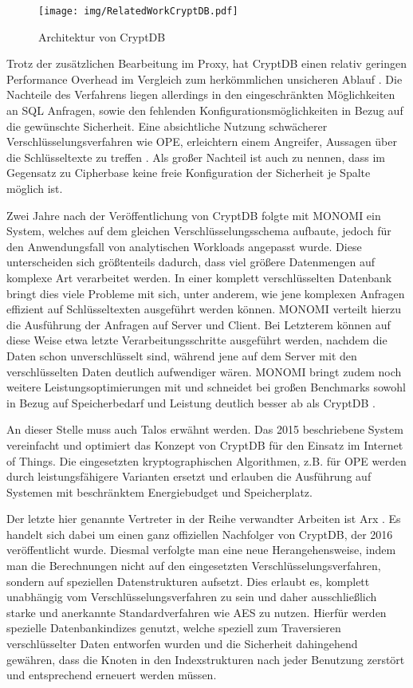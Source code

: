 \begin{figure}
	\texttt{[image: img/RelatedWorkCryptDB.pdf]}
	\centering
	\caption{Architektur von CryptDB}
	\label{fig:cryptdb}
\end{figure}

Trotz der zusätzlichen Bearbeitung im Proxy, hat CryptDB einen relativ geringen Performance Overhead im Vergleich zum herkömmlichen unsicheren Ablauf \cite{Popa2012}. Die Nachteile des Verfahrens liegen allerdings in den eingeschränkten Möglichkeiten an \ac{SQL} Anfragen, sowie den fehlenden Konfigurationsmöglichkeiten in Bezug auf die gewünschte Sicherheit. Eine absichtliche Nutzung schwächerer Verschlüsselungsverfahren wie OPE, erleichtern einem Angreifer, Aussagen über die Schlüsseltexte zu treffen \cite{Poddar2016}. Als großer Nachteil ist auch zu nennen, dass im Gegensatz zu Cipherbase keine freie Konfiguration der Sicherheit je Spalte möglich ist.

Zwei Jahre nach der Veröffentlichung von CryptDB folgte mit MONOMI \cite{Tu2013} ein System, welches auf dem gleichen Verschlüsselungsschema aufbaute, jedoch für den Anwendungsfall von analytischen Workloads angepasst wurde. Diese unterscheiden sich größtenteils dadurch, dass viel größere Datenmengen auf komplexe Art verarbeitet werden. In einer komplett verschlüsselten Datenbank bringt dies viele Probleme mit sich, unter anderem, wie jene komplexen Anfragen effizient auf Schlüsseltexten ausgeführt werden können. MONOMI verteilt hierzu die Ausführung der Anfragen auf Server und Client. Bei Letzterem können auf diese Weise etwa letzte Verarbeitungsschritte ausgeführt werden, nachdem die Daten schon unverschlüsselt sind, während jene auf dem Server mit den verschlüsselten Daten deutlich aufwendiger wären. MONOMI bringt zudem noch weitere Leistungsoptimierungen mit und schneidet bei großen Benchmarks sowohl in Bezug auf Speicherbedarf und Leistung deutlich besser ab als CryptDB \cite{Tu2013}.

An dieser Stelle muss auch Talos \cite{Shafagh2015} erwähnt werden. Das 2015 beschriebene System vereinfacht und optimiert das Konzept von CryptDB für den Einsatz im Internet of Things. Die eingesetzten kryptographischen Algorithmen, z.B. für OPE werden durch leistungsfähigere Varianten ersetzt und erlauben die Ausführung auf Systemen mit beschränktem Energiebudget und Speicherplatz.

Der letzte hier genannte Vertreter in der Reihe verwandter Arbeiten ist Arx \cite{Poddar2016}. Es handelt sich dabei um einen ganz offiziellen Nachfolger von CryptDB, der 2016 veröffentlicht wurde. Diesmal verfolgte man eine neue Herangehensweise, indem man die Berechnungen nicht auf den eingesetzten Verschlüsselungsverfahren, sondern auf speziellen Datenstrukturen aufsetzt. Dies erlaubt es, komplett unabhängig vom Verschlüsselungsverfahren zu sein und daher ausschließlich starke und anerkannte Standardverfahren wie \ac{AES} zu nutzen. Hierfür werden spezielle Datenbankindizes genutzt, welche speziell zum Traversieren verschlüsselter Daten entworfen wurden und die Sicherheit dahingehend gewähren, dass die Knoten in den Indexstrukturen nach jeder Benutzung zerstört und entsprechend erneuert werden müssen.

